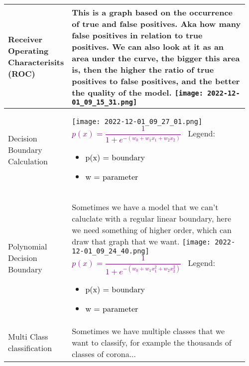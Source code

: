 \documentclass[main.tex,fontsize=8pt,paper=a4,paper=portrait,DIV=calc,]{scrartcl}
\begin{document}
\begin{table}[ht!]
\begin{tabular}{|m{0.2\linewidth}|m{0.755\linewidth}|}
\hline
Receiver Operating Characterisits (ROC) &
This is a graph based on the occurrence of true and false positives.\newline
Aka how many false positives in relation to true positives.\newline
We can also look at it as an area under the curve, the bigger this area is, then the higher the ratio of true positives to false positives, and the better the quality of the model.\newline
\texttt{[image: 2022-12-01\_09\_15\_31.png]}\\
\hline
Decision Boundary Calculation &
\texttt{[image: 2022-12-01\_09\_27\_01.png]}\newline
\large \textcolor{purple}{\(p(x) = \dfrac{1}{1 + e^{-(w_0 + w_1x_1 + w_2x_2)}}\)}\newline
\normalsize \, \newline 
Legend: \newline
\begin{itemize}
\item \textcolor{black}{p(x) = boundary}
\item \textcolor{black}{w = parameter}
\vspace{-3mm}
\end{itemize}\\ 
\hline
Polynomial Decision Boundary & 
Sometimes we have a model that we can't caluclate with a regular linear boundary, here we need something of higher order,\newline
which can draw that graph that we want.\newline
\texttt{[image: 2022-12-01\_09\_24\_40.png]}\newline
\large \textcolor{purple}{\(p(x) = \dfrac{1}{1 + e^{-(w_0 + w_1x_1^2 + w_2x_2^2)}}\)}\newline
\normalsize \, \newline 
Legend: \newline
\begin{itemize}
\item \textcolor{black}{p(x) = boundary}
\item \textcolor{black}{w = parameter}
\vspace{-3mm}
\end{itemize}\\ 
\hline
Multi Class classification & 
Sometimes we have multiple classes that we want to classify, for example the thousands of classes of corona...\newline

\end{tabular}
\end{table}
\end{document}
